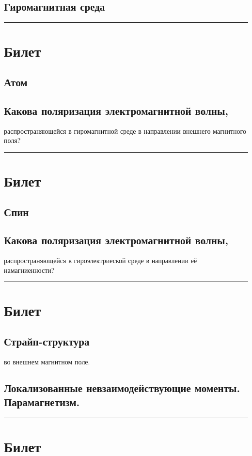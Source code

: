\documentclass[a4paper, 14pt, russian]{article}
\newcommand{\ihline}{\noindent\rule{\textwidth}{1pt}}
\begin{document}
		\subsection{Гиромагнитная среда}

	\ihline

	\section{Билет}
		\subsection{Атом}
		\subsection{Какова поляризация электромагнитной волны,}
		распространяющейся в гиромагнитной среде в 
		направлении внешнего магнитного поля?

	\ihline

	\section{Билет}
		\subsection{Спин}
		\subsection{Какова поляризация электромагнитной волны,}
		распространяющейся в гироэлектриеской среде в направлении
		её намагниенности?

	\ihline

	\section{Билет}
		\subsection{Страйп-структура}
		во внешнем магнитном поле.
		\subsection{Локализованные невзаимодействующие моменты.
		Парамагнетизм.}

	\ihline

	\section{Билет}
\end{document}
